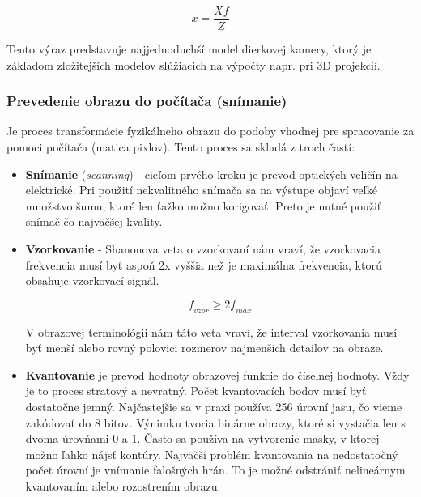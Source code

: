 \begin{equation}
    \textit{x}=\frac{X\textit{f}}{Z}
\end{equation}

Tento výraz predstavuje najjednoduchší model dierkovej kamery, ktorý je základom zložitejších modelov slúžiacich na výpočty napr. pri 3D projekcií. 

\subsubsection{Prevedenie obrazu do počítača (snímanie)}
Je proces transformácie fyzikálneho obrazu do podoby vhodnej pre spracovanie za pomoci počítača (matica pixlov). Tento proces sa skladá z troch častí:
\begin{itemize}
\item \textbf{Snímanie} (\textit{scanning}) - cieľom prvého kroku je prevod optických veličín na elektrické. Pri použití nekvalitného snímača sa na výstupe objaví veľké množstvo šumu, ktoré len ťažko možno korigovať. Preto je nutné použiť snímač čo najväčšej kvality. \cite{Analysis_and_Machine_Vision}

\item \textbf{Vzorkovanie} \cite{Analysis_and_Machine_Vision} - Shanonova veta o vzorkovaní nám vraví, že vzorkovacia frekvencia musí byť aspoň 2x vyššia než je maximálna frekvencia, ktorú obsahuje vzorkovací signál. \cite{Analysis_and_Machine_Vision}

\begin{equation}
    \textit{f}_{\textit{vzor}} \ge {2} \textit{f}_{\textit{max}}
\end{equation}

V obrazovej terminológii nám táto veta vraví, že interval vzorkovania musí byť menší alebo rovný polovici rozmerov najmenších detailov na obraze. 

\item \textbf{Kvantovanie} je prevod hodnoty obrazovej funkcie do číselnej hodnoty. Vždy je to proces stratový a nevratný. Počet kvantovacích bodov musí byť dostatočne jemný. Najčastejšie sa v praxi používa 256 úrovní jasu, čo vieme zakódovať do 8 bitov. Výnimku tvoria binárne obrazy, ktoré si vystačia len s dvoma úrovňami 0 a 1. Často sa používa na vytvorenie masky, v ktorej možno ľahko nájsť kontúry. Najväčší problém kvantovania na nedostatočný počet úrovní je vnímanie falošných hrán. To je možné odstrániť nelineárnym kvantovaním alebo rozostrením obrazu. \cite{Analysis_and_Machine_Vision}



\end{itemize}
